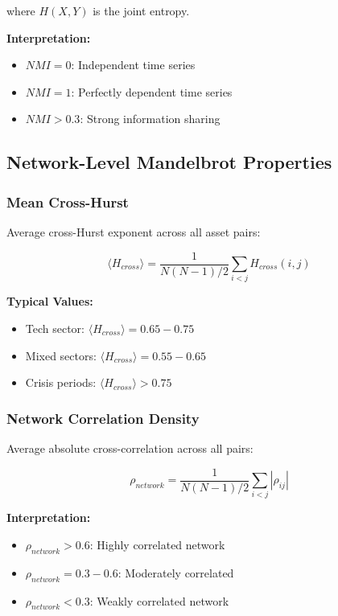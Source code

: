\documentclass[11pt,a4paper]{article}
\begin{document}
where $H(X,Y)$ is the joint entropy.

\textbf{Interpretation:}
\begin{itemize}
    \item $NMI = 0$: Independent time series
    \item $NMI = 1$: Perfectly dependent time series
    \item $NMI > 0.3$: Strong information sharing
\end{itemize}

\subsection{Network-Level Mandelbrot Properties}

\subsubsection{Mean Cross-Hurst}

Average cross-Hurst exponent across all asset pairs:

\begin{equation}
\langle H_{cross} \rangle = \frac{1}{N(N-1)/2} \sum_{i<j} H_{cross}(i,j)
\end{equation}

\textbf{Typical Values:}
\begin{itemize}
    \item Tech sector: $\langle H_{cross} \rangle = 0.65-0.75$
    \item Mixed sectors: $\langle H_{cross} \rangle = 0.55-0.65$
    \item Crisis periods: $\langle H_{cross} \rangle > 0.75$
\end{itemize}

\subsubsection{Network Correlation Density}

Average absolute cross-correlation across all pairs:

\begin{equation}
\rho_{network} = \frac{1}{N(N-1)/2} \sum_{i<j} |\rho_{ij}|
\end{equation}

\textbf{Interpretation:}
\begin{itemize}
    \item $\rho_{network} > 0.6$: Highly correlated network
    \item $\rho_{network} = 0.3-0.6$: Moderately correlated
    \item $\rho_{network} < 0.3$: Weakly correlated network
\end{itemize}
\end{document}
